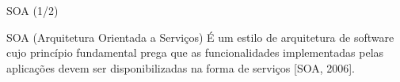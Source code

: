 \documentclass[xcolor=svgnames]{beamer}
\begin{document}
    \begin{frame}{SOA (1/2)}
            \begin{block}{SOA (Arquitetura Orientada a Serviços)}\vspace{-.3\baselineskip}
            É um estilo de arquitetura de software cujo princípio fundamental prega que as funcionalidades implementadas pelas
	    aplicações devem ser disponibilizadas na forma de serviços [SOA, 2006]. %
            \end{block}

            \tiny{
            }
    \end{frame}
\end{document}
